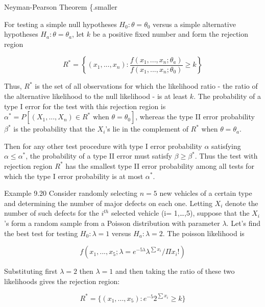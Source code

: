 \documentclass[
  ignorenonframetext,
]{beamer}
\begin{document}
\begin{frame}{Neyman-Pearson Theorem \{.smaller}
\protect\hypertarget{neyman-pearson-theorem-.smaller}{}
\begin{tcolorbox}[enhanced jigsaw, left=2mm, breakable, bottomrule=.15mm, colframe=quarto-callout-important-color-frame, arc=.35mm, leftrule=.75mm, colbacktitle=quarto-callout-important-color!10!white, titlerule=0mm, opacityback=0, coltitle=black, opacitybacktitle=0.6, colback=white, toprule=.15mm, toptitle=1mm, bottomtitle=1mm, title=\textcolor{quarto-callout-important-color}{\faExclamation}\hspace{0.5em}{Theorem}, rightrule=.15mm]

For testing a simple null hypotheses \(H_{0}: \theta = \theta_{0}\)
versus a simple alternative hypotheses \(H_{a}: \theta = \theta_{a}\),
let \(k\) be a positive fixed number and form the rejection region

\[ 
R^{*} = \left\{(x_{1},...,x_{n}): \frac{f(x_{1},...,x_{n};\theta_{a})}{f(x_{1},...,x_{n};\theta_{0})} \geq k \right\}
\]

Thus, \(R^{*}\) is the set of all observations for which the likelihood
ratio - the ratio of the alternative likelihood to the null likelihood -
is at least \(k\). The probability of a type I error for the test with
this rejection region is
\(\alpha^{*} = P[(X_{1},...,X_{n}) \in R^{*} \text{ when } \theta = \theta_{0}]\),
whereas the type II error probability \(\beta^{*}\) is the probability
that the \(X_{i}\)'s lie in the complement of \(R^{*}\) when
\(\theta = \theta_{a}\).

Then for any other test procedure with type I error probability
\(\alpha\) satisfying \(\alpha \leq \alpha^{*}\), the probability of a
type II error must satisfy \(\beta \geq \beta^{*}\). Thus the test with
rejection region \(R^{*}\) has the smallest type II error probability
among all tests for which the type I error probability is at most
\(\alpha^{*}\).

\end{tcolorbox}
\end{frame}

\begin{frame}{Example 9.20}
\protect\hypertarget{example-9.20}{}
Consider randomly selecting \(n=5\) new vehicles of a certain type and
determining the number of major defects on each one. Letting \(X_{i}\)
denote the number of such defects for the \(i^{th}\) selected vehicle
(i= 1,\ldots,5), suppose that the \(X_{i}\)'s form a random sample from
a Poisson distribution with parameter \(\lambda\). Let's find the best
test for testing \(H_{0}: \lambda = 1\) versus \(H_{a}: \lambda = 2\).
The poisson likelihood is

\[
f(x_{1},...,x_{5};\lambda = e^{-5\lambda}\lambda^{\sum x_{i}}/\Pi x_{i}!)
\]

Substituting first \(\lambda = 2\) then \(\lambda = 1\) and then taking
the ratio of these two likelihoods gives the rejection region:

\[
R^{*} = \{(x_{1},...,x_{5}):e^{-5}2^{\sum x_{i}} \geq k\}
\]
\end{frame}
\end{document}
